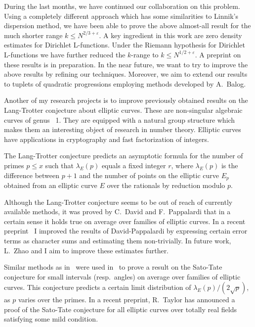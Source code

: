 During the last months, we have continued our collaboration on this problem. Using a completely different approach which has some similarities to Linnik's dispersion method, we have been able to prove the above almost-all result for the much shorter range $k\le N^{2/3+\varepsilon}$. A key ingredient in this work are zero density estimates for Dirichlet L-functions. Under the Riemann hypothesis for Dirichlet L-functions we have further reduced the $k$-range to $k\le N^{1/2+\varepsilon}$.
A preprint on these results is in preparation.  In the near future, we want to try to improve the above results by refining our techniques.  Moreover, we aim to extend our results to tuplets of quadratic progressions employing methods developed by A.~Balog.

Another of my research projects is to improve previously obtained results on the Lang-Trotter conjecture about elliptic curves. These are non-singular algebraic curves of genus ~1. They are equipped with a natural group structure which makes them an interesting object of research in number theory. Elliptic curves have applications in cryptography and fast factorization of integers.

The Lang-Trotter conjecture predicts an asymptotic formula for the number of primes $p\le x$ such that $\lambda_E(p)$ equals a fixed integer $r$, where  $\lambda_E(p)$ is the difference between $p+1$ and the number of points on the elliptic curve $E_p$ obtained from an elliptic curve $E$ over the rationals by reduction modulo $p$.

Although the Lang-Trotter conjecture seems to be out of reach of currently available methods, it was proved by C.~David and F.~Pappalardi that in a certain sense it holds true on average over families of elliptic curves. In a recent preprint~\cite{BAILAN} I improved the results of David-Pappalardi by expressing certain error terms as character sums and estimating them non-trivially. In future work, L.~Zhao and I aim to improve these estimates further.

Similar methods as in~\cite{BAILAN} were used in~\cite{BAZO2} to prove a
result on the Sato-Tate conjecture for small intervals (resp.\ angles) on average over families of elliptic curves. This conjecture predicts a certain limit distribution of $\lambda_E(p)/(2\sqrt{p})$, as $p$ varies over the primes. In a recent preprint, R.~Taylor has announced a proof of the Sato-Tate conjecture for all elliptic curves over totally real fields satisfying some mild condition.

